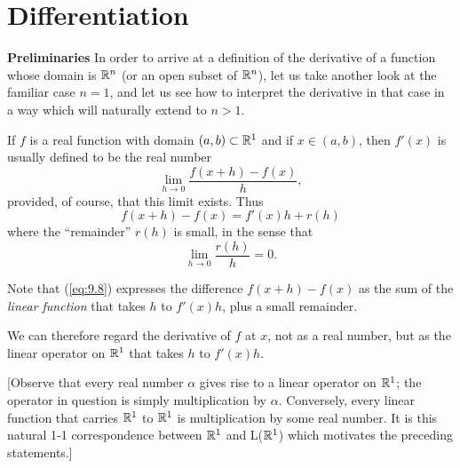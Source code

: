 \section{Differentiation}
\begin{myDef}
    \textbf{Preliminaries}
    In order to arrive at a definition of the derivative of a function whose domain is ${\protect\mathbb R}^n$ (or an open subset of ${\protect\mathbb R}^n$), 
    let us take another look at the familiar case $n = 1$, and let us see how to interpret the derivative in that case in a way which will naturally extend to $n > 1$. 

    If $f$ is a {\color{blue} real function} with domain $(a, b) \subset {\protect\mathbb R}^1$ and 
    if $x \in (a, b)$, then $f'(x)$ is usually defined to be the real number
    \begin{equation}
        \label{eq:9.7}
        \lim_{h \to 0} \frac{f(x+h) - f(x)}{h} ,
    \end{equation}
    provided, of course, that this limit exists. 
    Thus
    \begin{equation}
        \label{eq:9.8}
        f(x+h) - f(x) = f'(x)h + r(h)
    \end{equation}
    where the ``remainder'' $r(h)$ is small, in the sense that 
    \begin{equation}
        \label{eq:9.9}
        \lim_{h \to 0} \frac{r(h)}{h} = 0.
    \end{equation}
    
    Note that (\ref{eq:9.8}) expresses the difference $f(x + h) - f(x)$ as the sum of the \emph{linear function} that takes $h$ to $f'(x)h$, plus a small remainder.

    We can therefore regard the derivative of $f$ at $x$, not as a real number, but as the linear operator on ${\protect\mathbb R}^1$ that takes $h$ to $f'(x)h$.
    
    [Observe that every real number $\alpha$ gives rise to a linear operator on ${\protect\mathbb R}^1$; 
    the operator in question is simply multiplication by $\alpha$. 
    Conversely, every linear function that carries ${\protect\mathbb R}^1$ to ${\protect\mathbb R}^1$ is multiplication by some real number. 
    It is this natural 1-1 correspondence between ${\protect\mathbb R}^1$ and L(${\protect\mathbb R}^1$) which motivates the preceding statements.]
    

\end{myDef}
